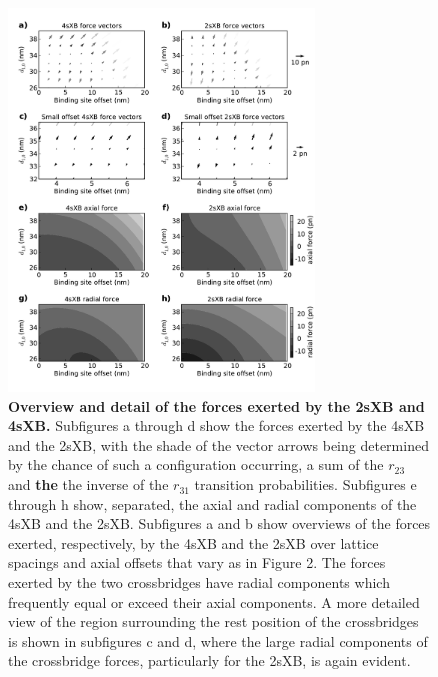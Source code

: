 \documentclass[]{article}
\begin{document}
\begin{figure}[htbp]
    \begin{center}
    \includegraphics[width=3.2in]{../imgs/Figure4.pdf}
    \caption{
        \label{fig_forces}
        \textbf{Overview and detail of the forces exerted by the 2sXB and 4sXB.}
        Subfigures a through d show the forces exerted by the 4sXB and the 2sXB, with the shade of the vector arrows being determined by the chance of such a configuration occurring, a sum of the $r_{23}$ and \textbf{the} the inverse of the $r_{31}$ transition probabilities. 
        Subfigures e through h show, separated, the axial and radial components of the 4sXB and the 2sXB.
        Subfigures a and b show overviews of the forces exerted, respectively, by the 4sXB and the 2sXB over lattice spacings and axial offsets that vary as in Figure 2.
        The forces exerted by the two crossbridges have radial components which frequently equal or exceed their axial components.
        A more detailed view of the region surrounding the rest position of the crossbridges is shown in subfigures c and d, where the large radial components of the crossbridge forces, particularly for the 2sXB, is again evident.
    }
    \end{center}
\end{figure}

% 




\clearpage


\end{document}
